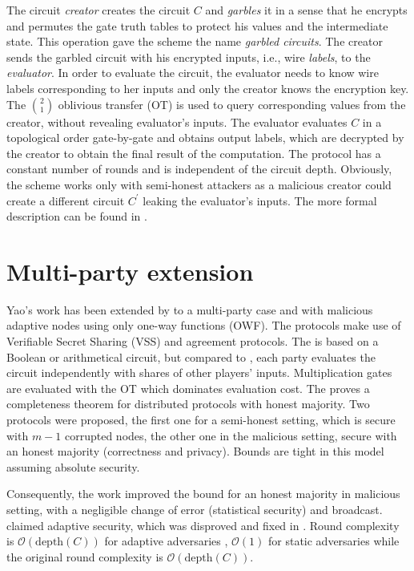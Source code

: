 \documentclass[
  digital, %
  twoside, %
  table,   %
  lof,     %
  lot,     %
]{fithesis3}
\newcommand{\bigO}[0]{\mathcal{O}}
\theoremstyle{definition}
\theoremstyle{remark}
\begin{document}
The circuit \emph{creator} creates the circuit $C$ and \emph{garbles} it in a sense that he encrypts and permutes the gate truth tables to protect his values and the intermediate state. This operation gave the scheme the name \emph{garbled circuits}. The creator sends the garbled circuit with his encrypted inputs, i.e., wire \emph{labels}, to the \emph{evaluator}. In order to evaluate the circuit, the evaluator needs to know wire labels corresponding to her inputs and only the creator knows the encryption key. The $\binom{2}{1}$ oblivious transfer (OT) is used to query corresponding values from the creator, without revealing evaluator's inputs. The evaluator evaluates $C$ in a topological order gate-by-gate and obtains output labels, which are decrypted by the creator to obtain the final result of the computation. The protocol has a constant number of rounds and is independent of the circuit depth. 
Obviously, the scheme works only with semi-honest attackers as a malicious creator could create a different circuit $C^\prime$ leaking the evaluator's inputs. The more formal description can be found in \cite{BHR12}. 

\section{Multi-party extension}\label{sec:soa:mpc}%
Yao's work has been extended by \cite{GMW87} to a multi-party case and with malicious adaptive nodes using only one-way functions (OWF). The protocols make use of Verifiable Secret Sharing (VSS) and agreement protocols. The \cite{GMW87} is based on a Boolean or arithmetical circuit, but compared to \cite{Yao86}, each party evaluates the circuit independently with shares of other players' inputs. Multiplication gates are evaluated with the OT which dominates evaluation cost. The \cite{GMW87} proves a completeness theorem for distributed protocols with honest majority. Two protocols were proposed, the first one for a semi-honest setting, which is secure with $m-1$ corrupted nodes, the other one in the malicious setting, secure with an honest majority (correctness and privacy). Bounds are tight in this model assuming absolute security. 

Consequently, the work \cite{RB89, B91} improved the bound for an honest majority in malicious setting, with a negligible change of error (statistical security) and broadcast.
\cite{RB89} claimed adaptive security, which was disproved and fixed in \cite{CDDHR99}.
Round complexity is $\bigO(\text{depth}(C))$ for adaptive adversaries \cite{GMW87, CDDHR99}, $\bigO(1)$ for static adversaries \cite{BMR90} while the original \cite{GMW87} round complexity is $\bigO(\text{depth}(C))$.
\end{document}
